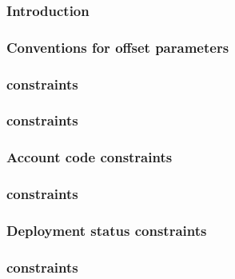 \subsubsection{Introduction}                                         \label{hub: account: specialized constraints: intro}                        
\subsubsection{Conventions for offset parameters}                    \label{hub: account: specialized constraints: conventions}                  
\subsubsection{\accNonce{} constraints \lispDone{}}                  \label{hub: account: specialized constraints: nonce}                        
\subsubsection{\accBalance{} constraints \lispDone{}}                \label{hub: account: specialized constraints: balance}                      
\subsubsection{Account code constraints \lispDone{}}                 \label{hub: account: specialized constraints: code}                         
\subsubsection{\accWarmth{} constraints \lispDone{}}                 \label{hub: account: specialized constraints: warmth}                       
\subsubsection{Deployment status constraints \lispDone{}}            \label{hub: account: specialized constraints: deployment}                   
\subsubsection{\accMarkedForSelfdestruct{} constraints \lispDone{}}  \label{hub: account: specialized constraints: marked for selfdestruct}      
